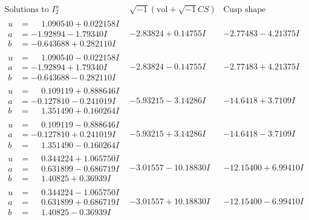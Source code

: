 \documentclass[1p]{elsarticle_modified}
\theoremstyle{definition}
\newcommand{\I}{\sqrt{-1}}
\begin{document}
$$\begin{array}{c|c|c}  
\text{Solutions to }I^u_{2}& \I (\text{vol} + \sqrt{-1}CS) & \text{Cusp shape}\\
 \hline 
\begin{aligned}
u &= \phantom{-}1.090540 + 0.022158 I \\
a &= -1.92894 - 1.79340 I \\
b &= -0.643688 + 0.282110 I\end{aligned}
 & -2.83824 + 0.14755 I & -2.77483 - 4.21375 I \\ \hline\begin{aligned}
u &= \phantom{-}1.090540 - 0.022158 I \\
a &= -1.92894 + 1.79340 I \\
b &= -0.643688 - 0.282110 I\end{aligned}
 & -2.83824 - 0.14755 I & -2.77483 + 4.21375 I \\ \hline\begin{aligned}
u &= \phantom{-}0.109119 + 0.888646 I \\
a &= -0.127810 - 0.241019 I \\
b &= \phantom{-}1.351490 + 0.160264 I\end{aligned}
 & -5.93215 - 3.14286 I & -14.6418 + 3.7109 I \\ \hline\begin{aligned}
u &= \phantom{-}0.109119 - 0.888646 I \\
a &= -0.127810 + 0.241019 I \\
b &= \phantom{-}1.351490 - 0.160264 I\end{aligned}
 & -5.93215 + 3.14286 I & -14.6418 - 3.7109 I \\ \hline\begin{aligned}
u &= \phantom{-}0.344224 + 1.065750 I \\
a &= \phantom{-}0.631899 - 0.686719 I \\
b &= \phantom{-}1.40825 + 0.36939 I\end{aligned}
 & -3.01557 - 10.18830 I & -12.15400 + 6.99410 I \\ \hline\begin{aligned}
u &= \phantom{-}0.344224 - 1.065750 I \\
a &= \phantom{-}0.631899 + 0.686719 I \\
b &= \phantom{-}1.40825 - 0.36939 I\end{aligned}
 & -3.01557 + 10.18830 I & -12.15400 - 6.99410 I \\ \hline\begin{aligned}

\end{aligned}
\end{array}$$
\end{document}
